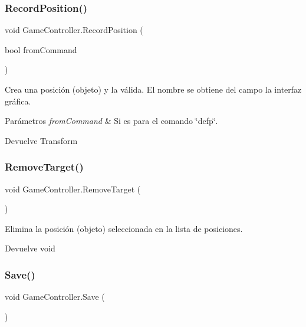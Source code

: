 \subsubsection{\texorpdfstring{RecordPosition()}{RecordPosition()}}
{\footnotesize\ttfamily void Game\+Controller.\+Record\+Position (\begin{DoxyParamCaption}\item[{bool}]{from\+Command }\end{DoxyParamCaption})\hspace{0.3cm}{\ttfamily [inline]}}

Crea una posición (objeto) y la válida. El nombre se obtiene del campo la interfaz gráfica. 
\begin{DoxyParams}{Parámetros}
{\em from\+Command} & Si es para el comando \char`\"{}defp\char`\"{}. \\
\hline
\end{DoxyParams}
\begin{DoxyReturn}{Devuelve}
Transform 
\end{DoxyReturn}
\mbox{\label{class_game_controller_ad8f76a41d0163fd06971dffce1d61c97}} 
\subsubsection{\texorpdfstring{RemoveTarget()}{RemoveTarget()}}
{\footnotesize\ttfamily void Game\+Controller.\+Remove\+Target (\begin{DoxyParamCaption}{ }\end{DoxyParamCaption})\hspace{0.3cm}{\ttfamily [inline]}}

Elimina la posición (objeto) seleccionada en la lista de posiciones. \begin{DoxyReturn}{Devuelve}
void 
\end{DoxyReturn}
\mbox{\label{class_game_controller_a59400b0ec3bf7841017faafba0a35f81}} 
\subsubsection{\texorpdfstring{Save()}{Save()}}
{\footnotesize\ttfamily void Game\+Controller.\+Save (\begin{DoxyParamCaption}{ }\end{DoxyParamCaption})\hspace{0.3cm}{\ttfamily [inline]}}

